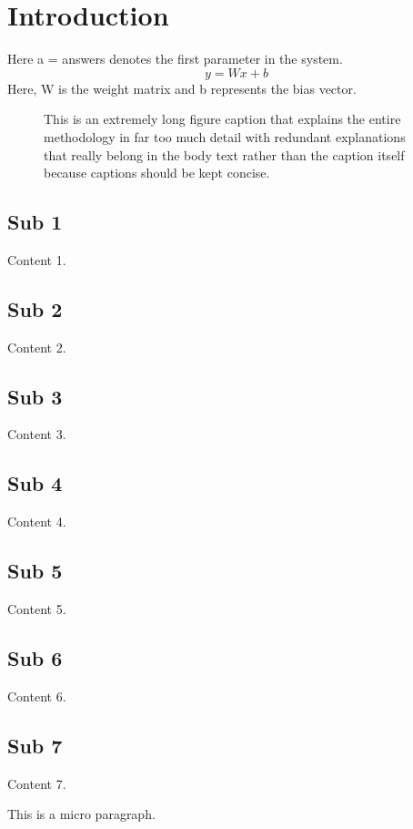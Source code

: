 \section{Introduction}
Here a = answers denotes the first parameter in the system.
\begin{equation}
y = W x + b
\end{equation}
Here, W is the weight matrix and b represents the bias vector.

\begin{figure}[t]
\caption{This is an extremely long figure caption that explains the entire methodology in far too much detail with redundant explanations that really belong in the body text rather than the caption itself because captions should be kept concise.}
\end{figure}

\subsection{Sub 1}
Content 1.
\subsection{Sub 2}
Content 2.
\subsection{Sub 3}
Content 3.
\subsection{Sub 4}
Content 4.
\subsection{Sub 5}
Content 5.
\subsection{Sub 6}
Content 6.
\subsection{Sub 7}
Content 7.

This is a micro paragraph.
